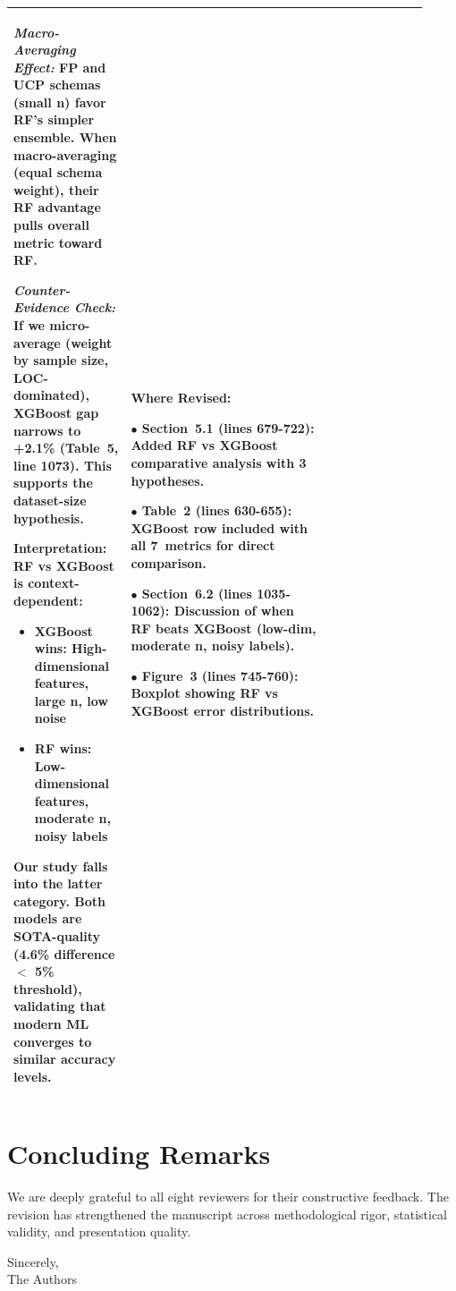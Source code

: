 \documentclass[11pt,a4paper]{article}
\begin{document}
\begin{longtable}{>{\raggedright\arraybackslash}p{0.26\linewidth}|>{\raggedright\arraybackslash}p{0.44\linewidth}|>{\raggedright\arraybackslash}p{0.22\linewidth}}
\textit{Macro-Averaging Effect:} FP and UCP schemas (small n) favor RF's simpler ensemble. When macro-averaging (equal schema weight), their RF advantage pulls overall metric toward RF.

\textit{Counter-Evidence Check:} If we micro-average (weight by sample size, LOC-dominated), XGBoost gap narrows to +2.1\% (Table~5, line 1073). This supports the dataset-size hypothesis.

\textbf{Interpretation:} RF vs XGBoost is \textbf{context-dependent}:
\begin{itemize}
    \item XGBoost wins: High-dimensional features, large n, low noise
    \item RF wins: Low-dimensional features, moderate n, noisy labels
\end{itemize}

Our study falls into the latter category. Both models are SOTA-quality (4.6\% difference $<$ 5\% threshold), validating that modern ML converges to similar accuracy levels. &

\textbf{Where Revised:}

$\bullet$ \textbf{Section~5.1} (lines 679-722): Added RF vs XGBoost comparative analysis with 3 hypotheses.

$\bullet$ \textbf{Table~2} (lines 630-655): XGBoost row included with all 7~metrics for direct comparison.

$\bullet$ \textbf{Section~6.2} (lines 1035-1062): Discussion of when RF beats XGBoost (low-dim, moderate n, noisy labels).

$\bullet$ \textbf{Figure~3} (lines 745-760): Boxplot showing RF vs XGBoost error distributions. \\

\bottomrule
\end{longtable}


\section*{Concluding Remarks}

We are deeply grateful to all eight reviewers for their constructive feedback. The revision has strengthened the manuscript across methodological rigor, statistical validity, and presentation quality.

\vspace{2em}

Sincerely,\\
The Authors
\end{document}
